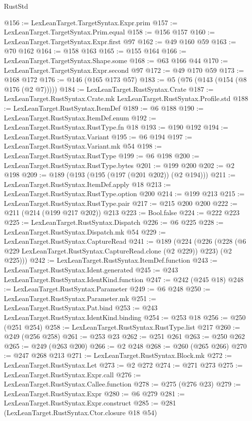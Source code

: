 \begin{lexlean}{RustStd}
\begin{coremodule}
@156 := LexLeanTarget.TargetSyntax.Expr.prim
@157 := LexLeanTarget.TargetSyntax.Prim.equal
@158 := @156 @157
@160 := LexLeanTarget.TargetSyntax.Expr.first @97
@162 := @49 @160 @59
@163 := @70 @162
@164 := @158 @163
@165 := @155 @164
@166 := LexLeanTarget.TargetSyntax.Shape.some
@168 := @63 @166 @44
@170 := LexLeanTarget.TargetSyntax.Expr.second @97
@172 := @49 @170 @59
@173 := @168 @172
@176 := @146 (@165 @173 @57)
@183 := @5 (@76 (@143 (@154 (@8 @176 (@2 @7)))))
@184 := LexLeanTarget.RustSyntax.Crate
@187 := LexLeanTarget.RustSyntax.Crate.mk LexLeanTarget.RustSyntax.Profile.std
@188 := LexLeanTarget.RustSyntax.ItemDef
@189 := @6 @188
@190 := LexLeanTarget.RustSyntax.ItemDef.enum
@192 := LexLeanTarget.RustSyntax.RustType.fn @18
@193 := @190 @192
@194 := LexLeanTarget.RustSyntax.Variant
@195 := @6 @194
@197 := LexLeanTarget.RustSyntax.Variant.mk @54
@198 := LexLeanTarget.RustSyntax.RustType
@199 := @6 @198
@200 := LexLeanTarget.RustSyntax.RustType.bytes
@201 := @199 @200
@202 := @2 @198
@209 := @189 (@193 (@195 (@197 (@201 @202)) (@2 @194)))
@211 := LexLeanTarget.RustSyntax.ItemDef.apply @18
@213 := LexLeanTarget.RustSyntax.RustType.option @200
@214 := @199 @213
@215 := LexLeanTarget.RustSyntax.RustType.pair
@217 := @215 @200 @200
@222 := @211 (@214 (@199 @217 @202)) @213
@223 := Bool.false
@224 := @222 @223
@225 := LexLeanTarget.RustSyntax.Dispatch
@226 := @6 @225
@228 := LexLeanTarget.RustSyntax.Dispatch.mk @54
@229 := LexLeanTarget.RustSyntax.CaptureRead
@241 := @189
    (@224
      (@226 (@228 (@6 @229 LexLeanTarget.RustSyntax.CaptureRead.clone (@2 @229)) @223) (@2 @225)))
@242 := LexLeanTarget.RustSyntax.ItemDef.function
@243 := LexLeanTarget.RustSyntax.Ident.generated
@245 := @243 LexLeanTarget.RustSyntax.IdentKind.function
@247 := @242 (@245 @18)
@248 := LexLeanTarget.RustSyntax.Parameter
@249 := @6 @248
@250 := LexLeanTarget.RustSyntax.Parameter.mk
@251 := LexLeanTarget.RustSyntax.Pat.bind
@253 := @243 LexLeanTarget.RustSyntax.IdentKind.binding
@254 := @253 @18
@256 := @250 (@251 @254)
@258 := LexLeanTarget.RustSyntax.RustType.list @217
@260 := @249 (@256 @258)
@261 := @253 @23
@262 := @251 @261
@263 := @250 @262
@265 := @249 (@263 @200)
@266 := @2 @248
@268 := @260 (@265 @266)
@270 := @247 @268 @213
@271 := LexLeanTarget.RustSyntax.Block.mk
@272 := LexLeanTarget.RustSyntax.Let
@273 := @2 @272
@274 := @271 @273
@275 := LexLeanTarget.RustSyntax.Expr.call
@276 := LexLeanTarget.RustSyntax.Callee.function
@278 := @275 (@276 @23)
@279 := LexLeanTarget.RustSyntax.Expr
@280 := @6 @279
@281 := LexLeanTarget.RustSyntax.Expr.construct
@285 := @281 (LexLeanTarget.RustSyntax.Ctor.closure @18 @54)

\end{coremodule}
\end{lexlean}
